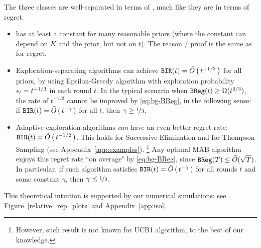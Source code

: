 The three classes are well-separated in terms of \BIR, much like they are in terms of regret.
\begin{itemize}
\item \DynGreedy has at least a constant \BIR for many reasonable priors (where the constant can depend on $K$ and the prior, but not on $t$). The reason / proof is the same as for regret.

\item Exploration-separating algorithms can achieve
    $\mathtt{BIR}(t) = \tilde{O}\left(\,t^{-1/3}\,\right)$
for all priors, \eg by using Epsilon-Greedy algorithm with exploration probability $\epsilon_t = t^{-1/3}$ in each round $t$.
In the typical scenario when
 $\mathtt{BReg}(t)\geq \Omega(t^{2/3})$,
the \BIR rate of $t^{-1/3}$  cannot be improved by \eqref{eq:bg-BReg}, in the following sense:
if
    $\mathtt{BIR}(t) = \tilde{O}\left(\,t^{-\gamma}\,\right)$
for all $t$, then $\gamma\geq \nicefrac{1}{3}$.

\item Adaptive-exploration algorithms \emph{can} have an even better regret rate: $\mathtt{BIR}(t) = \tilde{O}\left(\, t^{-1/2} \,\right) $. This holds for Successive Elimination \citep{EvenDar-icml06} and for Thompson Sampling (see Appendix~\ref{app:examples}).%
    \footnote{However, such result is not known for UCB1 algorithm, to the best of our knowledge.}
    Any optimal MAB algorithm enjoys this regret rate ``on average" by \eqref{eq:bg-BReg}, since
        $\mathtt{BReg}(T)\leq \tilde{O}(\sqrt{T})$.
    In particular, if such algorithm satisfies
        $\mathtt{BIR}(t) = \tilde{O}\left(\,t^{-\gamma}\,\right)$
    for all rounds $t$ and some constant $\gamma$, then $\gamma \leq \nicefrac{1}{2}$.

\end{itemize}

\noindent This theoretical intuition is supported by our numerical simulations: see
Figure~\ref{relative_rep_plots} and Appendix~\ref{app:isol}.



